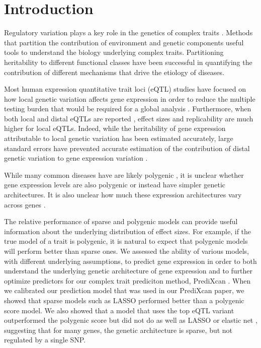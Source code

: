 \documentclass[10pt,letterpaper]{article}
\begin{document}
\linenumbers

\section*{Introduction}
Regulatory variation plays a key role in the genetics of complex traits \cite{Nicolae_2010, Nica_2010, Gusev_2014}. Methods that partition the contribution of environment and genetic components useful tools to understand the biology underlying complex traits. Partitioning heritability to different functional classes have been successful in quantifying the contribution of different mechanisms that drive the etiology of diseases.

Most human expression quantitative trait loci (eQTL) studies have focused on how local genetic variation affects gene expression in order to reduce the multiple testing burden that would be required for a global analysis \cite{Albert_2015, Stranger_2012}. Furthermore, when both local and distal eQTLs are reported \cite{Stranger_2007,Innocenti_2011,Wright_2014}, effect sizes and replicability are much higher for local eQTLs. Indeed, while the heritability of gene expression attributable to local genetic variation has been estimated accurately, large standard errors have prevented accurate estimation of the contribution of distal genetic variation to gene expression variation \cite{Wright_2014,Price_2011}. 

While many common diseases have are likely polygenic \cite{Purcell_2009,Stahl_2012,Morris_2012}, it is unclear whether gene expression levels are also polygenic or instead have simpler genetic architectures. It is also unclear how much these expression architectures vary across genes \cite{Albert_2015}. 

The relative performance of sparse and polygenic models can provide useful information about the underlying distribution of effect sizes. For example, if the true model of a trait is polygenic, it is natural to expect that polygenic models will perform better than sparse ones. We assessed the ability of various models, with different underlying assumptions, to predict gene expression in order to both understand the underlying genetic architecture of gene expression and to further optimize predictors for our complex trait prediciton method, PrediXcan \cite{Gamazon_2015}. When we calibrated our prediction model that was used in our PrediXcan paper, we showed that sparse models such as LASSO performed better than a polygenic score model. We also showed that a model that uses the top eQTL variant outperformed the polygenic score but did not do as well as LASSO or elastic net \cite{Gamazon_2015}, suggesting that for many genes, the genetic architecture is sparse, but not regulated by a single SNP. 
\end{document}

